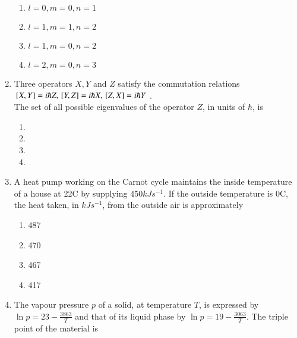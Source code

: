 \documentclass[journal]{IEEEtran}
\begin{document}
\begin{enumerate}[start=35]
\begin{multicols}{2}
    \begin{enumerate}
        \item $l=0,m=0,n=1$
        \item $l=1,m=1,n=2$
        \item $l=1,m=0,n=2$
        \item $l=2,m=0,n=3$
    \end{enumerate}
\end{multicols}
\item  Three operators $X,Y$ and $Z$ satisfy the commutation relations\\ ${}\left[X,Y\right]=i\hbar Z,{}\left[Y, Z\right]=i\hbar X,{}\left[Z, X\right]=i\hbar Y$ .\\The set of all possible eigenvalues of the operator $Z$, in units of $\hbar$, is
\begin{multicols}{2}
    \begin{enumerate}
        \item {}
        \item {}
        \item {}
        \item {}
    \end{enumerate}
\end{multicols}
\item A heat pump working on the Carnot cycle maintains the inside temperature of a house at 22\degree C by supplying $450 kJ s^{-1}$. If the outside temperature is 0\degree C, the heat taken, in $kJ s^{-1}$, from the outside air is approximately
\begin{multicols}{4}
    \begin{enumerate}
        \item 487
        \item 470
        \item 467
        \item 417
    \end{enumerate}
\end{multicols}
\item The vapour pressure $p$  of a solid, at temperature $T$, is expressed by $\ln p = 23-\frac{3863}{T}$ and that of its liquid phase by $\ln p = 19-\frac{3063}{T}$. The triple point of the material is
\begin{multicols}{4}
    \begin{enumerate}

\end{enumerate}
\end{multicols}
\end{enumerate}
\end{document}
